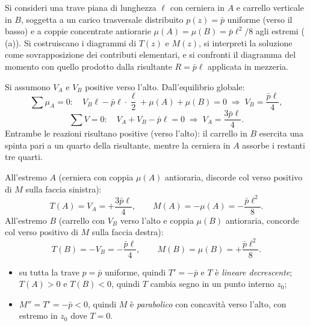 \begin{esempio}
	Si consideri una trave piana di lunghezza $\ell$
	con cerniera in $A$ e carrello verticale in $B$,
	soggetta a un carico trasversale distribuito
	$p(z) = \bar{p}$ uniforme (verso il basso) e
	a coppie concentrate antiorarie $\mu(A) = \mu(B)
	= \bar{p}\ell^2/8$ agli estremi
	(\,(a)).
	Si costruiscano i diagrammi di $T(z)$ e $M(z)$,
	si interpreti la soluzione come sovrapposizione
	dei contributi elementari, e si confronti il
	diagramma del momento con quello prodotto dalla
	risultante $R = \bar p\ell$ applicata in mezzeria.
	
	\begin{svolgimento}
		
		
		Si assumono $V_A$ e $V_B$ positive verso l'alto.
		Dall'equilibrio globale:
		\[
		\sum \mu_A = 0:\quad
		V_B\ell - \bar{p}\ell\cdot\frac{\ell}{2}
		+ \mu(A) + \mu(B) = 0
		\;\Rightarrow\;
		V_B = \frac{\bar p\ell}{4},
		\]
		\[
		\sum V = 0:\quad
		V_A + V_B - \bar{p}\ell = 0
		\;\Rightarrow\;
		V_A = \frac{3\bar p\ell}{4}.
		\]
		Entrambe le reazioni risultano positive (verso
		l'alto): il carrello in $B$ esercita una spinta
		pari a un quarto della risultante, mentre la
		cerniera in $A$ assorbe i restanti tre quarti.
		
		All'estremo $A$ (cerniera con coppia $\mu(A)$
		antioraria, discorde col verso positivo di $M$
		sulla faccia sinistra):
		\[
		T(A) = V_A = +\frac{3\bar p\ell}{4},
		\qquad
		M(A) = -\mu(A) = -\frac{\bar p\ell^2}{8}.
		\]
		All'estremo $B$ (carrello con $V_B$ verso l'alto
		e coppia $\mu(B)$ antioraria, concorde col verso
		positivo di $M$ sulla faccia destra):
		\[
		T(B) = -V_B = -\frac{\bar p\ell}{4},
		\qquad
		M(B) = \mu(B) = +\frac{\bar p\ell^2}{8}.
		\]
		



		
		
		\begin{itemize}[nosep]
			\item su tutta la trave $p = \bar p$ uniforme,
			quindi $T' = -\bar p$ e $T$ è \emph{lineare
				decrescente}; $T(A) > 0$ e $T(B) < 0$, quindi
			$T$ cambia segno in un punto interno $z_0$;
			\item $M'' = T' = -\bar p < 0$, quindi $M$ è
			\emph{parabolico} con concavità verso l'alto,
			con estremo in $z_0$ dove $T = 0$.
		\end{itemize}
		

\end{svolgimento}
\end{esempio}
